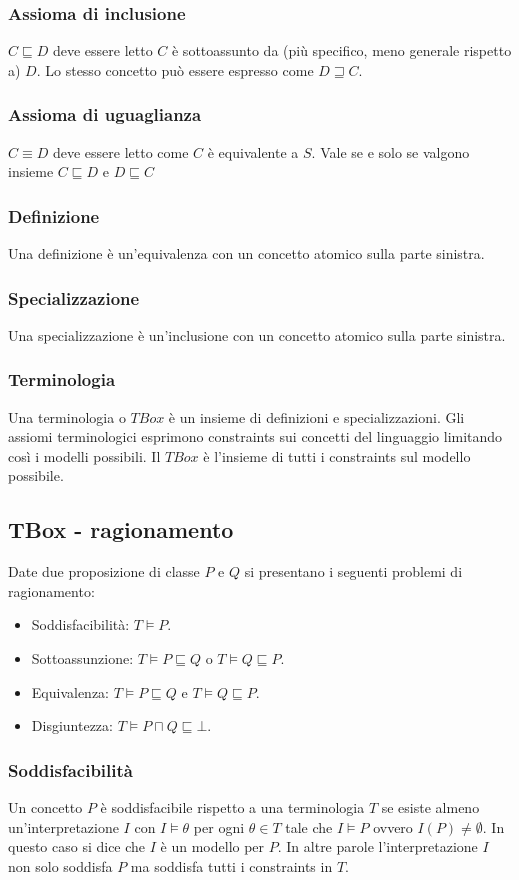 \subsubsection{Assioma di inclusione}
$C\sqsubseteq D$ deve essere letto $C$ \`e sottoassunto da (pi\`u specifico, meno generale rispetto a) $D$. Lo stesso concetto pu\`o essere espresso come $D\sqsupseteq C$.
\subsubsection{Assioma di uguaglianza}
$C\equiv D$ deve essere letto come $C$ \`e equivalente a $S$. Vale se e solo se valgono insieme $C\sqsubseteq D$ e $D\sqsubseteq C$
\subsubsection{Definizione}
Una definizione \`e un'equivalenza con un concetto atomico sulla parte sinistra.
\subsubsection{Specializzazione}
Una specializzazione \`e un'inclusione con un concetto atomico sulla parte sinistra.
\subsubsection{Terminologia}
Una terminologia o $TBox$ \`e un insieme di definizioni e specializzazioni. Gli assiomi terminologici esprimono constraints sui concetti del linguaggio limitando cos\`i i modelli possibili. Il $TBox$ \`e l'insieme
di tutti i constraints sul modello possibile.
\subsection{TBox - ragionamento}
Date due proposizione di classe $P$ e $Q$ si presentano i seguenti problemi di ragionamento:
\begin{itemize}
\item Soddisfacibilit\`a: $T\models P$.
\item Sottoassunzione: $T\models P\sqsubseteq Q$ o $T\models Q\sqsubseteq P$.
\item Equivalenza: $T\models P\sqsubseteq Q$ e $T\models Q\sqsubseteq P$.
\item Disgiuntezza: $T\models P\sqcap Q\sqsubseteq\bot$.
\end{itemize}
\subsubsection{Soddisfacibilit\`a}
Un concetto $P$ \`e soddisfacibile rispetto a una terminologia $T$ se esiste almeno un'interpretazione $I$ con $I\models\theta$ per ogni $\theta\in T$ tale che $I\models P$ ovvero $I(P)\neq\emptyset$. In
questo caso si dice che $I$ \`e un modello per $P$. In altre parole l'interpretazione $I$ non solo soddisfa $P$ ma soddisfa tutti i constraints in $T$.
